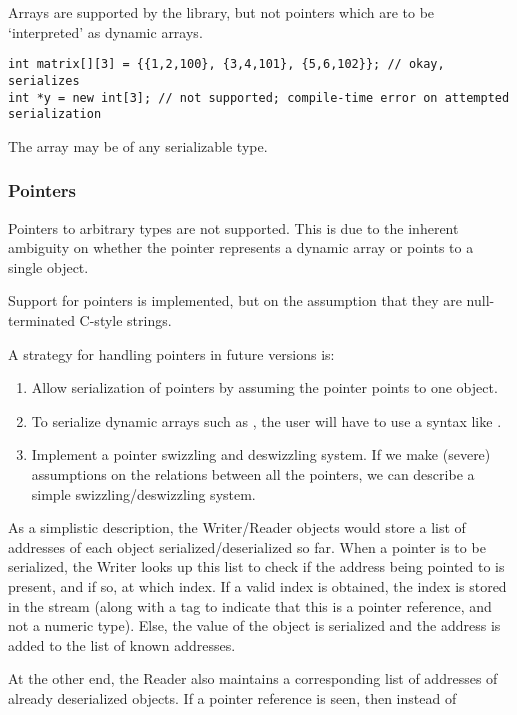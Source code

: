 \documentclass{article}
\begin{document}
Arrays are supported by the library, but not pointers which are to be
`interpreted' as dynamic arrays. 

\begin{lstlisting}
int matrix[][3] = {{1,2,100}, {3,4,101}, {5,6,102}}; // okay, serializes
int *y = new int[3]; // not supported; compile-time error on attempted serialization
\end{lstlisting}

The array may be of any serializable type.

\subsubsection{Pointers}

Pointers to arbitrary types are not supported. This is due to the
inherent ambiguity on whether the pointer represents a dynamic array
or points to a single object.

Support for  pointers is implemented, but on the
assumption that they are null-terminated C-style strings.

A strategy for handling pointers in future versions is:
\begin{enumerate}
\item Allow serialization of pointers by assuming the pointer points
  to one object.
\item To serialize dynamic arrays such as , the user will have to use a syntax like .
\item Implement a pointer swizzling and deswizzling system. If we make
  (severe) assumptions on the relations between all the pointers, we
  can describe a simple swizzling/deswizzling system.
\end{enumerate}

As a simplistic description, the Writer/Reader objects would store a
list of addresses of each object serialized/deserialized so far. When
a pointer is to be serialized, the Writer looks up this list to check
if the address being pointed to is present, and if so, at which
index. If a valid index is obtained, the index is stored in the stream
(along with a tag to indicate that this is a pointer reference, and
not a numeric type). Else, the value of the object is serialized and
the address is added to the list of known addresses.

At the other end, the Reader also maintains a corresponding list of
addresses of already deserialized objects. If a pointer reference is
seen, then instead of 
\end{document}
